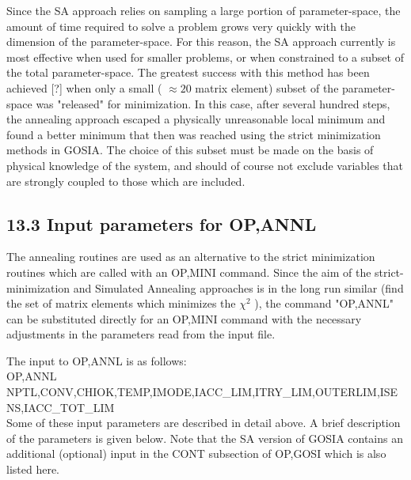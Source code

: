 \documentclass[10pt]{article}
\begin{document}
Since the SA approach relies on sampling a large portion of parameter-space, the amount of time required to solve a problem grows very quickly with the dimension of the parameter-space. For this reason, the SA approach currently is most effective when used for smaller problems, or when constrained to a subset of the total parameter-space. The greatest success with this method has been achieved [?] when only a small ( $\approx 20$ matrix element) subset of the parameter-space was "released" for minimization. In this case, after several hundred steps, the annealing approach escaped a physically unreasonable local minimum and found a better minimum that then was reached using the strict minimization methods in GOSIA. The choice of this subset must be made on the basis of physical knowledge of the system, and should of course not exclude variables that are strongly coupled to those which are included.

\subsection*{13.3 Input parameters for OP,ANNL}
The annealing routines are used as an alternative to the strict minimization routines which are called with an OP,MINI command. Since the aim of the strict-minimization and Simulated Annealing approaches is in the long run similar (find the set of matrix elements which minimizes the $\chi^{2}$ ), the command "OP,ANNL" can be substituted directly for an OP,MINI command with the necessary adjustments in the parameters read from the input file.

The input to OP,ANNL is as follows:\\
OP,ANNL\\
NPTL,CONV,CHIOK,TEMP,IMODE,IACC\_LIM,ITRY\_LIM,OUTERLIM,ISENS,IACC\_TOT\_LIM\\
Some of these input parameters are described in detail above. A brief description of the parameters is given below. Note that the SA version of GOSIA contains an additional (optional) input in the CONT subsection of OP,GOSI which is also listed here.
\end{document}
